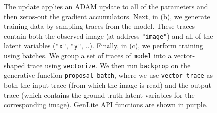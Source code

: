 \begin{figure}[t]
{The update applies an ADAM update to all of the parameters and then zeros-out the gradient accumulators.
Next, in (b), we generate training data by sampling traces from the model.
These traces contain both the observed image (at address \texttt{"image"}) and all of the latent variables (\texttt{"x"}, \texttt{"y"}, ..).
Finally, in (c), we perform training using batches.
We group a set of traces of \texttt{model} into a vector-shaped trace using \texttt{vectorize}.
We then run \texttt{backprop} on the generative function \texttt{proposal\_batch}, where we use \texttt{vector\_trace} as both the input trace (from which the image is read) and the output trace (which contains the ground truth latent variables for the corresponding image).
GenLite API functions are shown in purple.
}
\label{fig:training-code-figure}
\end{figure}

